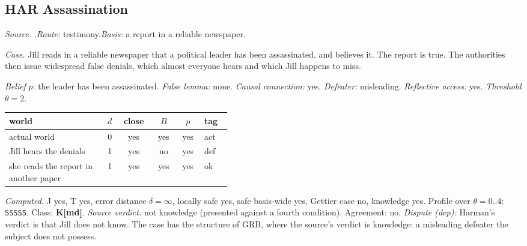 \subsection*{HAR \enspace Assassination}
\noindent\textit{Source.} \citet{Harman1973}.\quad \textit{Route:} testimony.\quad \textit{Basis:} a report in a reliable newspaper.\par
\noindent\textit{Case.} Jill reads in a reliable newspaper that a political leader has been assassinated, and believes it. The report is true. The authorities then issue widespread false denials, which almost everyone hears and which Jill happens to miss.\par
\noindent\textit{Belief} $p$: the leader has been assassinated.
 \textit{False lemma:} none. \textit{Causal connection:} yes. \textit{Defeater:} misleading. \textit{Reflective access:} yes. \textit{Threshold} $\theta = 2$.\par
\begin{center}\begin{tabular}{@{}p{0.43\linewidth}rcccl@{}}
world & $d$ & close & $B$ & $p$ & tag \\ \midrule
actual world & 0 & yes & yes & yes & act \\
Jill hears the denials & 1 & yes & no & yes & def \\
she reads the report in another paper & 1 & yes & yes & yes & ok \\
\end{tabular}\end{center}
\noindent\textit{Computed.} J yes, T yes, error distance $\delta = \infty$, locally safe yes, safe basis-wide yes, Gettier case no, knowledge yes. Profile over $\theta = 0..4$: \texttt{SSSSS}. Class: \textbf{K[md]}.
 \textit{Source verdict:} not knowledge (presented against a fourth condition). Agreement: no.
 \textit{Dispute (dep):} Harman's verdict is that Jill does not know. The case has the structure of GRB, where the source's verdict is knowledge: a misleading defeater the subject does not possess.
\par\medskip
{}
